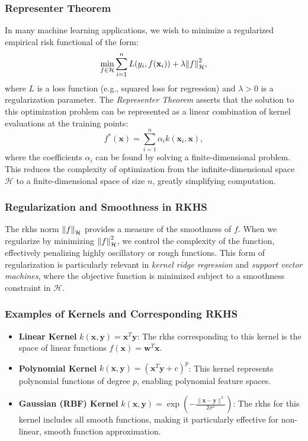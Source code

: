 \subsubsection{Representer Theorem}

In many machine learning applications, we wish to minimize a regularized empirical risk functional of the form:
\[
\min_{f \in \mathcal{H}} \sum_{i=1}^n L(y_i, f(\mathbf{x}_i)) + \lambda \norm{f}_{\mathcal{H}}^2,
\]
where $L$ is a loss function (e.g., squared loss for regression) and $\lambda > 0$ is a regularization parameter. The \textit{Representer Theorem} asserts that the solution to this optimization problem can be represented as a linear combination of kernel evaluations at the training points:
\[
f^*(\mathbf{x}) = \sum_{i=1}^n \alpha_i k(\mathbf{x}_i, \mathbf{x}),
\]
where the coefficients $\alpha_i$ can be found by solving a finite-dimensional problem. This reduces the complexity of optimization from the infinite-dimensional space $\mathcal{H}$ to a finite-dimensional space of size $n$, greatly simplifying computation.

\subsubsection{Regularization and Smoothness in RKHS}

The \ac{rkhs} norm $\norm{f}_{\mathcal{H}}$ provides a measure of the smoothness of $f$. When we regularize by minimizing $\norm{f}_{\mathcal{H}}^2$, we control the complexity of the function, effectively penalizing highly oscillatory or rough functions. This form of regularization is particularly relevant in \textit{kernel ridge regression} and \textit{support vector machines}, where the objective function is minimized subject to a smoothness constraint in $\mathcal{H}$.

\subsubsection{Examples of Kernels and Corresponding RKHS}

\begin{itemize}
    \item \textbf{Linear Kernel} $k(\mathbf{x}, \mathbf{y}) = \mathbf{x}^T \mathbf{y}$: The \ac{rkhs} corresponding to this kernel is the space of linear functions $f(\mathbf{x}) = \mathbf{w}^T \mathbf{x}$.
    \item \textbf{Polynomial Kernel} $k(\mathbf{x}, \mathbf{y}) = (\mathbf{x}^T \mathbf{y} + c)^p$: This kernel represents polynomial functions of degree $p$, enabling polynomial feature spaces.
    \item \textbf{Gaussian (RBF) Kernel} $k(\mathbf{x}, \mathbf{y}) = \exp\left(-\frac{\|\mathbf{x} - \mathbf{y}\|^2}{2\sigma^2}\right)$: The \ac{rkhs} for this kernel includes all smooth functions, making it particularly effective for non-linear, smooth function approximation.
\end{itemize}





